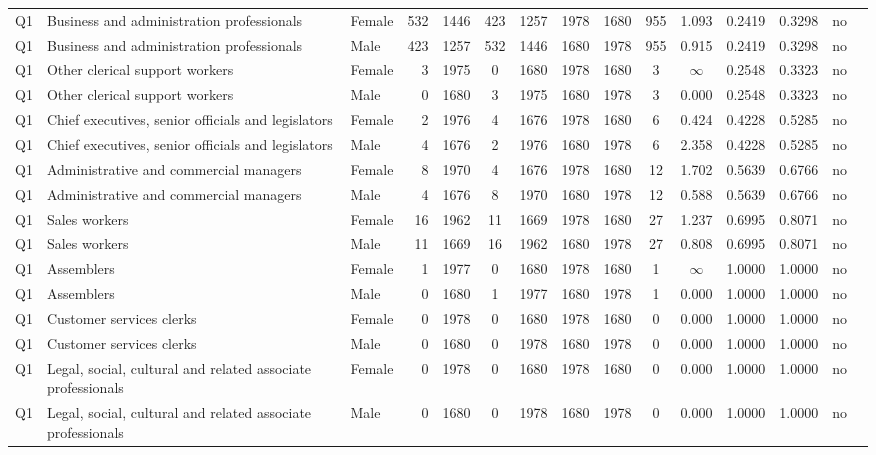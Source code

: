 \begin{longtable}{lllrcccccccccll}
Q1 & Business and administration professionals & Female & 532 & 1446 & 423 & 1257 & 1978 & 1680 & 955 & 1.093 & 0.2419 & 0.3298 & no \\
Q1 & Business and administration professionals & Male & 423 & 1257 & 532 & 1446 & 1680 & 1978 & 955 & 0.915 & 0.2419 & 0.3298 & no \\
Q1 & Other clerical support workers & Female & 3 & 1975 & 0 & 1680 & 1978 & 1680 & 3 & $\infty$ & 0.2548 & 0.3323 & no \\
Q1 & Other clerical support workers & Male & 0 & 1680 & 3 & 1975 & 1680 & 1978 & 3 & 0.000 & 0.2548 & 0.3323 & no \\
Q1 & Chief executives, senior officials and legislators & Female & 2 & 1976 & 4 & 1676 & 1978 & 1680 & 6 & 0.424 & 0.4228 & 0.5285 & no \\
Q1 & Chief executives, senior officials and legislators & Male & 4 & 1676 & 2 & 1976 & 1680 & 1978 & 6 & 2.358 & 0.4228 & 0.5285 & no \\
Q1 & Administrative and commercial managers & Female & 8 & 1970 & 4 & 1676 & 1978 & 1680 & 12 & 1.702 & 0.5639 & 0.6766 & no \\
Q1 & Administrative and commercial managers & Male & 4 & 1676 & 8 & 1970 & 1680 & 1978 & 12 & 0.588 & 0.5639 & 0.6766 & no \\
Q1 & Sales workers & Female & 16 & 1962 & 11 & 1669 & 1978 & 1680 & 27 & 1.237 & 0.6995 & 0.8071 & no \\
Q1 & Sales workers & Male & 11 & 1669 & 16 & 1962 & 1680 & 1978 & 27 & 0.808 & 0.6995 & 0.8071 & no \\
Q1 & Assemblers & Female & 1 & 1977 & 0 & 1680 & 1978 & 1680 & 1 & $\infty$ & 1.0000 & 1.0000 & no \\
Q1 & Assemblers & Male & 0 & 1680 & 1 & 1977 & 1680 & 1978 & 1 & 0.000 & 1.0000 & 1.0000 & no \\
Q1 & Customer services clerks & Female & 0 & 1978 & 0 & 1680 & 1978 & 1680 & 0 & 0.000 & 1.0000 & 1.0000 & no \\
Q1 & Customer services clerks & Male & 0 & 1680 & 0 & 1978 & 1680 & 1978 & 0 & 0.000 & 1.0000 & 1.0000 & no \\
Q1 & Legal, social, cultural and related associate professionals & Female & 0 & 1978 & 0 & 1680 & 1978 & 1680 & 0 & 0.000 & 1.0000 & 1.0000 & no \\
Q1 & Legal, social, cultural and related associate professionals & Male & 0 & 1680 & 0 & 1978 & 1680 & 1978 & 0 & 0.000 & 1.0000 & 1.0000 & no \\

\end{longtable}
